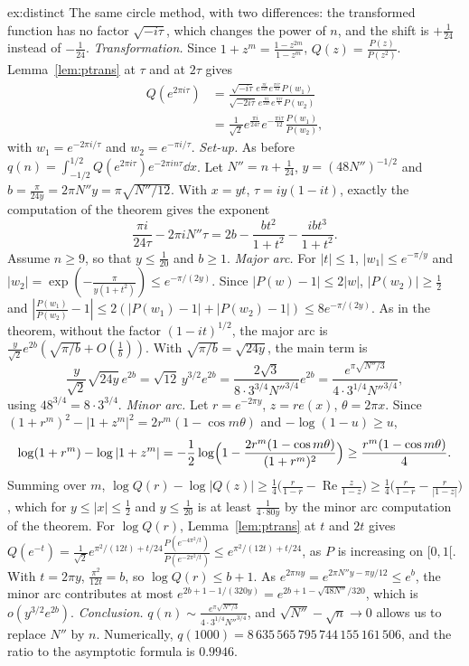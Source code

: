 \begin{solution}{ex:distinct}
\idea The same circle method, with two differences: the transformed function has no factor $\sqrt{-i\tau}$, which changes the power of $n$, and the shift is $+\frac1{24}$ instead of $-\frac1{24}$.
\writeup \emph{Transformation.} Since $1+z^m=\frac{1-z^{2m}}{1-z^m}$, $Q(z)=\frac{P(z)}{P(z^2)}$. Lemma~\ref{lem:ptrans} at $\tau$ and at $2\tau$ gives
\[
\begin{aligned}Q(e^{2\pi i\tau})&=\frac{\sqrt{-i\tau}\,e^{\frac{\pi i}{12\tau}}e^{\frac{\pi i\tau}{12}}P(w_1)}{\sqrt{-2i\tau}\,e^{\frac{\pi i}{24\tau}}e^{\frac{\pi i\tau}6}P(w_2)}\\&=\frac1{\sqrt2}e^{\frac{\pi i}{24\tau}}e^{-\frac{\pi i\tau}{12}}\frac{P(w_1)}{P(w_2)},\end{aligned}
\]
with $w_1=e^{-2\pi i/\tau}$ and $w_2=e^{-\pi i/\tau}$.
\emph{Set-up.} As before $q(n)=\int_{-1/2}^{1/2}Q(e^{2\pi i\tau})e^{-2\pi in\tau}\dd x$. Let $N''=n+\frac1{24}$, $y=(48N'')^{-1/2}$ and $b=\frac\pi{24y}=2\pi N''y=\pi\sqrt{N''/12}$. With $x=yt$, $\tau=iy(1-it)$, exactly the computation of the theorem gives the exponent
\[
\frac{\pi i}{24\tau}-2\pi iN''\tau=2b-\frac{bt^2}{1+t^2}-\frac{ibt^3}{1+t^2}.
\]
Assume $n\ge9$, so that $y\le\frac1{20}$ and $b\ge1$.
\emph{Major arc.} For $|t|\le1$, $|w_1|\le e^{-\pi/y}$ and $|w_2|=\exp(-\frac\pi{y(1+t^2)})\le e^{-\pi/(2y)}$. Since $|P(w)-1|\le2|w|$, $|P(w_2)|\ge\frac12$ and $|\frac{P(w_1)}{P(w_2)}-1|\le2(|P(w_1)-1|+|P(w_2)-1|)\le8e^{-\pi/(2y)}$. As in the theorem, without the factor $(1-it)^{1/2}$, the major arc is $\frac y{\sqrt2}e^{2b}(\sqrt{\pi/b}+O(\frac1b))$. With $\sqrt{\pi/b}=\sqrt{24y}$, the main term is
\[
\frac y{\sqrt2}\sqrt{24y}\,e^{2b}=\sqrt{12}\,y^{3/2}e^{2b}=\frac{2\sqrt3}{8\cdot3^{3/4}N''^{3/4}}e^{2b}=\frac{e^{\pi\sqrt{N''/3}}}{4\cdot3^{1/4}N''^{3/4}},
\]
using $48^{3/4}=8\cdot3^{3/4}$.
\emph{Minor arc.} Let $r=e^{-2\pi y}$, $z=re(x)$, $\theta=2\pi x$. Since $(1+r^m)^2-|1+z^m|^2=2r^m(1-\cos m\theta)$ and $-\log(1-u)\ge u$,
\[
\log(1+r^m)-\log|1+z^m|=-\frac12\log\Bigl(1-\frac{2r^m(1-\cos m\theta)}{(1+r^m)^2}\Bigr)\ge\frac{r^m(1-\cos m\theta)}4.
\]
Summing over $m$, $\log Q(r)-\log|Q(z)|\ge\frac14\bigl(\frac r{1-r}-\operatorname{Re}\frac z{1-z}\bigr)\ge\frac14\bigl(\frac r{1-r}-\frac r{|1-z|}\bigr)$, which for $y\le|x|\le\frac12$ and $y\le\frac1{20}$ is at least $\frac1{4\cdot80y}$ by the minor arc computation of the theorem. For $\log Q(r)$, Lemma~\ref{lem:ptrans} at $t$ and $2t$ gives $Q(e^{-t})=\frac1{\sqrt2}e^{\pi^2/(12t)+t/24}\frac{P(e^{-4\pi^2/t})}{P(e^{-2\pi^2/t})}\le e^{\pi^2/(12t)+t/24}$, as $P$ is increasing on $[0,1[$. With $t=2\pi y$, $\frac{\pi^2}{12t}=b$, so $\log Q(r)\le b+1$. As $e^{2\pi ny}=e^{2\pi N''y-\pi y/12}\le e^b$, the minor arc contributes at most $e^{2b+1-1/(320y)}=e^{2b+1-\sqrt{48N''}/320}$, which is $o(y^{3/2}e^{2b})$.
\emph{Conclusion.} $q(n)\sim\frac{e^{\pi\sqrt{N''/3}}}{4\cdot3^{1/4}N''^{3/4}}$, and $\sqrt{N''}-\sqrt n\to0$ allows us to replace $N''$ by $n$. Numerically, $q(1000)=8\,635\,565\,795\,744\,155\,161\,506$, and the ratio to the asymptotic formula is $0.9946$.
\end{solution}

